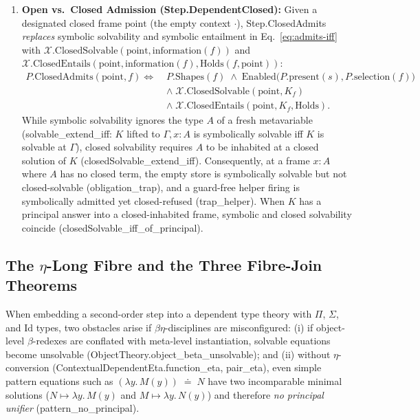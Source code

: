 \documentclass[11pt,a4paper]{article}
\theoremstyle{definition}
\DeclareRobustCommand{\lean}[1]{%
  \ifmmode\text{\normalfont\ttfamily\footnotesize\detokenize{#1}}%
  \else{\normalfont\footnotesize\leanurl{#1}}\fi}
\def\lean#1{#1}%
\newcommand{\doteqStore}{\;\doteq\;}
\begin{document}
\begin{enumerate}[leftmargin=2em, nosep]
  \item \textbf{Open vs.\ Closed Admission (\lean{Step.DependentClosed}):}
  Given a designated closed frame $\mathrm{point}$ (the empty context $\cdot$), \lean{Step.ClosedAdmits} \emph{replaces} symbolic solvability and symbolic entailment in Eq.~\eqref{eq:admits-iff} with $\mathcal{X}.\mathrm{ClosedSolvable}(\mathrm{point}, \mathrm{information}(f))$ and $\mathcal{X}.\mathrm{ClosedEntails}(\mathrm{point}, \mathrm{information}(f), \mathrm{Holds}(f, \mathrm{point}))$:
  \[
  \begin{aligned}
    P.\mathrm{ClosedAdmits}(\mathrm{point}, f) \iff\;& P.\mathrm{Shapes}(f) \;\land\; \mathrm{Enabled}\big(P.\mathrm{present}(s), P.\mathrm{selection}(f)\big) \\
    &\land\; \mathcal{X}.\mathrm{ClosedSolvable}(\mathrm{point}, K_f) \\
    &\land\; \mathcal{X}.\mathrm{ClosedEntails}(\mathrm{point}, K_f, \mathrm{Holds}).
  \end{aligned}
  \]
  While symbolic solvability ignores the type $A$ of a fresh metavariable (\lean{solvable_extend_iff}: $K$ lifted to $\Gamma, x:A$ is symbolically solvable iff $K$ is solvable at $\Gamma$), closed solvability requires $A$ to be inhabited at a closed solution of $K$ (\lean{closedSolvable_extend_iff}). Consequently, at a frame $x : A$ where $A$ has no closed term, the empty store is symbolically solvable but not closed-solvable (\lean{obligation_trap}), and a guard-free helper firing is symbolically admitted yet closed-refused (\lean{trap_helper}). When $K$ has a principal answer into a closed-inhabited frame, symbolic and closed solvability coincide (\lean{closedSolvable_iff_of_principal}).
\end{enumerate}

\subsection{The \texorpdfstring{$\eta$}{eta}-Long Fibre and the Three Fibre-Join Theorems}

When embedding a second-order step into a dependent type theory with $\Pi$, $\Sigma$, and $\mathrm{Id}$ types, two obstacles arise if $\beta\eta$-disciplines are misconfigured: (i) if object-level $\beta$-redexes are conflated with meta-level instantiation, solvable equations become unsolvable (\lean{ObjectTheory.object_beta_unsolvable}); and (ii) without $\eta$-conversion (\lean{ContextualDependentEta.function_eta}, \lean{pair_eta}), even simple pattern equations such as $(\lambda y.\, M(y)) \doteqStore N$ have two incomparable minimal solutions ($N \mapsto \lambda y.\, M(y)$ and $M \mapsto \lambda y.\, N(y)$) and therefore \emph{no principal unifier} (\lean{pattern_no_principal}).
\end{document}
